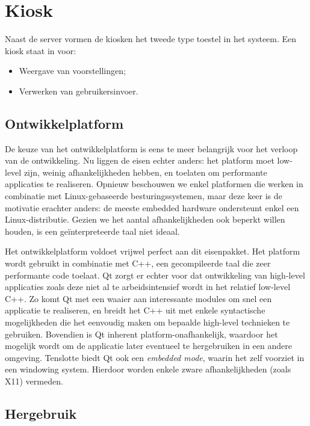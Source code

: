 \documentclass[verslag.tex]{subfiles}
\begin{document}
\section{Kiosk}
\label{ontwerp:applicatie:kiosk}

Naast de server vormen de kiosken het tweede type toestel in het systeem. Een kiosk staat in voor:
\begin{itemize}
\item Weergave van voorstellingen;
\item Verwerken van gebruikersinvoer.
\end{itemize}

\subsection{Ontwikkelplatform}

De keuze van het ontwikkelplatform is eens te meer belangrijk voor het verloop van de ontwikkeling. Nu liggen de eisen echter anders: het platform moet low-level zijn, weinig afhankelijkheden hebben, en toelaten om performante applicaties te realiseren. Opnieuw beschouwen we enkel platformen die werken in combinatie met Linux-gebaseerde besturingssystemen, maar deze keer is de motivatie erachter anders: de meeste embedded hardware ondersteunt enkel een Linux-distributie. Gezien we het aantal afhankelijkheden ook beperkt willen houden, is een geïnterpreteerde taal niet ideaal.

Het ontwikkelplatform  voldoet vrijwel perfect aan dit eisenpakket. Het platform wordt gebruikt in combinatie met C++, een gecompileerde taal die zeer performante code toelaat. Qt zorgt er echter voor dat ontwikkeling van high-level applicaties zoals deze niet al te arbeidsintensief wordt in het relatief low-level C++. Zo komt Qt met een waaier aan interessante modules om snel een applicatie te realiseren, en breidt het C++ uit met enkele syntactische mogelijkheden die het eenvoudig maken om bepaalde high-level technieken te gebruiken. Bovendien is Qt inherent platform-onafhankelijk, waardoor het mogelijk wordt om de applicatie later eventueel te hergebruiken in een andere omgeving. Tenslotte biedt Qt ook een \emph{embedded mode}, waarin het zelf voorziet in een windowing system. Hierdoor worden enkele zware afhankelijkheden (zoals X11) vermeden.

\subsection{Hergebruik}
\end{document}
